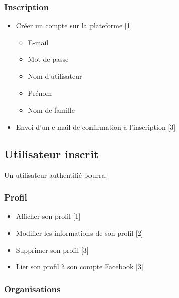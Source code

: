 \documentclass[11pt, a4paper, french, twoside]{article}
\begin{document}
			\subsubsection{Inscription}
			\label{subsubsec:inscription}
			
				\begin{itemize}
					\item Créer un compte sur la plateforme [1]
						\begin{itemize}
							\item E-mail
							\item Mot de passe
							\item Nom d'utilisateur
							\item Prénom
							\item Nom de famille
						\end{itemize}
					\item Envoi d'un e-mail de confirmation à l'inscription [3]
				\end{itemize}
		
		\subsection{Utilisateur inscrit}
		\label{subsec:utilisateur_inscrit}
			Un utilisateur authentifié pourra:
			
			\subsubsection{Profil}
			\label{subsubsec:profil}
			
				\begin{itemize}
					\item Afficher son profil [1]
					\item Modifier les informations de son profil [2]
					\item Supprimer son profil [3]
					\item Lier son profil à son compte Facebook [3]
				\end{itemize}
			
			\subsubsection{Organisations}
			\label{subsubsec:organisations}
			
\end{document}
